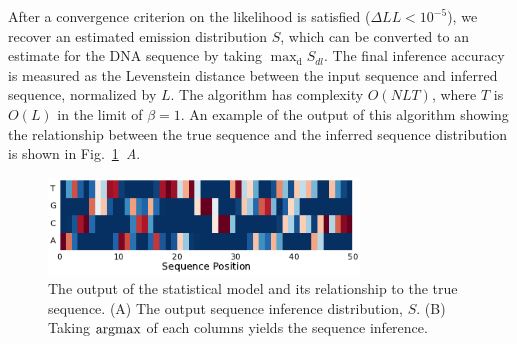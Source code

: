 \documentclass{biophys_letter}
\newcommand{\argmax}{\operatornamewithlimits{argmax}}
\newcommand{\bias}{\beta}
\newcommand{\kje}[1]{\textcolor{BurntOrange}{#1}}
\begin{document}
After a convergence criterion on the likelihood is satisfied (${\Delta}LL<10^{-5}$), we recover an estimated emission distribution $S$, which can be converted to an estimate for the DNA sequence by taking $\mathrm{\max_{d}} {S_{dl}}$.
The final inference accuracy is measured as the Levenstein distance between the input sequence and inferred sequence, normalized by $L$.
The algorithm has complexity $O(NLT)$, where $T$ is $O(L)$ in the limit of $\bias=1$.
An example of the output of this algorithm showing the relationship between the true sequence and the inferred sequence distribution is shown in Fig.~\ref{fig:inference_output}\emph{~A}.

\begin{figure}
  \centering
  \includegraphics[width=3.25in]{fig/fig2_new.pdf}
  \caption{The output of the statistical model and its relationship to the true sequence. (A) The output sequence inference distribution, $S$. (B) Taking $\argmax$ of each columns yields the sequence inference.}
  \label{fig:inference_output}
\end{figure}
\end{document}
